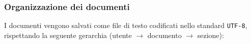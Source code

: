 \subsubsection{Organizzazione dei documenti}
I documenti vengono salvati come file di testo codificati nello standard \texttt{UTF-8}, rispettando la seguente gerarchia (utente $\rightarrow$ documento $\rightarrow$ sezione):

\medskip

